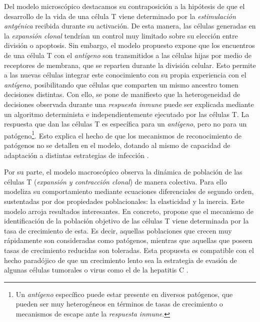 Del modelo microscópico destacamos su contraposición a la hipótesis de que el desarrollo de la vida de una célula T viene determinado por la \textit{estimulación antgénica} recibida durante su activación. De esta manera, las células generadas en la \textit{expansión clonal} tendrían un control muy limitado sobre su elección entre división o apoptosis. Sin embargo, el modelo propuesto expone que los encuentros de una célula T con el \textit{antígeno} son transmitidos a las células hijas por medio de receptores de membrana, que se reparten durante la división celular. Esto permite a las nuevas células integrar este conocimiento con su propia experiencia con el \textit{antígeno}, posibilitando que células que comparten un mismo ancestro tomen decisiones distintas. Con ello, se pone de manifiesto que la heterogeneidad de decisiones observada durante una \textit{respuesta inmune} puede ser explicada mediante un algoritmo determinista e independientemente ejecutado por las células T. La respuesta que dan las células T es específica para un \textit{antígeno}, pero no para un patógeno\footnote{Un \textit{antígeno} específico puede estar presente en diversos patógenos, que pueden ser muy heterogéneos en términos de tasas de crecimiento o mecanismos de escape ante la \textit{respuesta inmune}.}. Esto explica el hecho de que los mecanismos de reconocimiento de patógenos no se detallen en el modelo, dotando al mismo de capacidad de adaptación a distintas estrategias de infección \citep{JTB}.

Por su parte, el modelo macroscópico observa la dinámica de población de las células T (\textit{expansión y contracción clonal}) de manera colectiva. Para ello modeliza su comportamiento mediante ecuaciones diferenciales de segundo orden, sustentadas por dos propiedades poblacionales: la elasticidad y la inercia. Este modelo arroja resultados interesantes. En concreto, propone que el mecanismo de identificación de la población objetivo de las células T viene determinada por la tasa de crecimiento de esta. Es decir, aquellas poblaciones que crecen muy rápidamente son consideradas como patógenos, mientras que aquellas que poseen tasas de crecimiento reducidas son toleradas. Esta propuesta es compatible con el hecho paradójico de que un crecimiento lento sea la estrategia de evasión de algunas células tumorales o virus como el de la hepatitis C \citep{arias2015growth}. 


